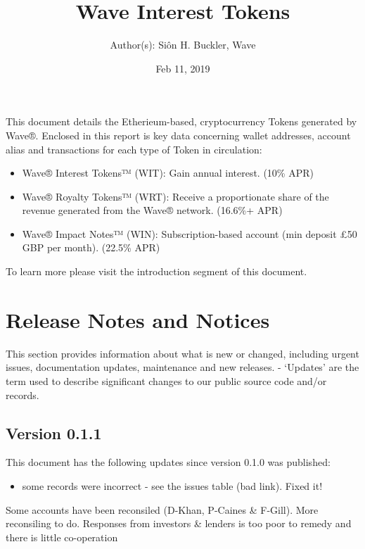 \documentclass[letterpaper,10pt,openany,oneside,english]{sphinxmanual}
\title{Wave Interest Tokens}
\date{Feb 11, 2019}
\author{Author(s): Siôn H. Buckler, Wave}
\begin{document}
\maketitle
\sphinxtableofcontents
{}\label{\detokenize{index::doc}}


This document details the Etherieum-based, cryptocurrency Tokens generated by Wave®.
Enclosed in this report is key data concerning wallet addresses, account alias and transactions for each type of Token in circulation:
\begin{itemize}
\item {} 
Wave® Interest Tokens™ (WIT): Gain annual interest. (10\% APR)

\item {} 
Wave® Royalty Tokens™ (WRT): Receive a proportionate share of the revenue generated from the Wave® network. (16.6\%+ APR)

\item {} 
Wave® Impact Notes™ (WIN): Subscription-based account (min deposit £50 GBP per month). (22.5\% APR)

\end{itemize}

To learn more please visit the introduction segment of this document.


\chapter{Release Notes and Notices}
\label{\detokenize{releasenotes:release-notes-and-notices}}\label{\detokenize{releasenotes::doc}}
This section provides information about what is new or changed, including urgent issues, documentation updates, maintenance and new releases.
- ‘Updates’ are the term used to describe significant changes to our public source code and/or records.


\section{Version 0.1.1}
\label{\detokenize{releasenotes:version-0-1-1}}
This document has the following updates since version 0.1.0 was published:
\begin{itemize}
\item {} 
some records were incorrect - see the issues table (bad link). Fixed it!

\end{itemize}

Some accounts have been reconsiled (D-Khan, P-Caines \& F-Gill).
More reconsiling to do. Responses from investors \& lenders is too poor to remedy and there is little co-operation
\end{document}
